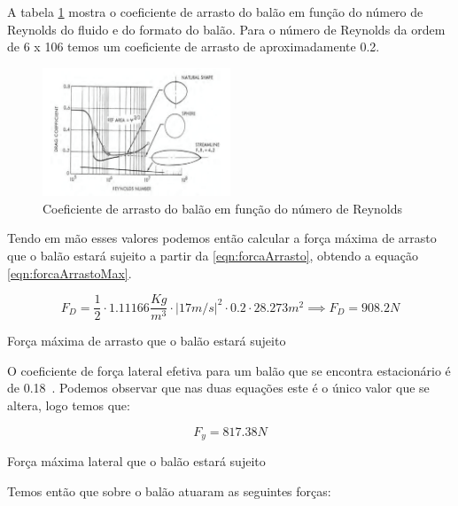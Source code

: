 	A tabela \ref{img:coeficienteArrasto} mostra o coeficiente de arrasto do balão em função do número de Reynolds do fluido e do formato do balão. Para o número de Reynolds da ordem de 6 x 106  temos um coeficiente de arrasto de aproximadamente 0.2.

	\begin{figure}[H]
		\centering
		\includegraphics[width=0.5\textwidth]{figuras/coeficienteArrasto}
		\caption[Coeficiente de arrasto do balão em função do número de Reynolds do fluido e do formato do balão]{Coeficiente de arrasto do balão em função do número de Reynolds~\cite{myers}}
		\label{img:coeficienteArrasto}
	\end{figure}

	Tendo em mão esses valores podemos então calcular a força máxima de arrasto que o balão estará sujeito a partir da \eqref{eqn:forcaArrasto}, obtendo a equação \eqref{eqn:forcaArrastoMax}.

	\begin{equacao}[H]
		\begin{equation}
			F_{D} = \frac{1}{2} \cdot 1.11166 \frac{Kg}{m^{3}} \cdot \left | 17m/s \right |^{2} \cdot 0.2 \cdot 28.273m^{2} \implies F_{D} = 908.2 N
		\end{equation}
		\caption{Força máxima de arrasto que o balão estará sujeito}
		\label{eqn:forcaArrastoMax}
	\end{equacao}

	O coeficiente de força lateral efetiva para um balão que se encontra estacionário é de 0.18~\cite{ferguson}. Podemos observar que nas duas equações este é o único valor que se altera, logo temos que:

	\begin{equacao}[H]
		\begin{equation}
			F_y = 817.38 N
		\end{equation}
		\caption{Força máxima lateral que o balão estará sujeito}
		\label{eqn:forcaLateralMax}
	\end{equacao}

	Temos então que sobre o balão atuaram as seguintes forças:


